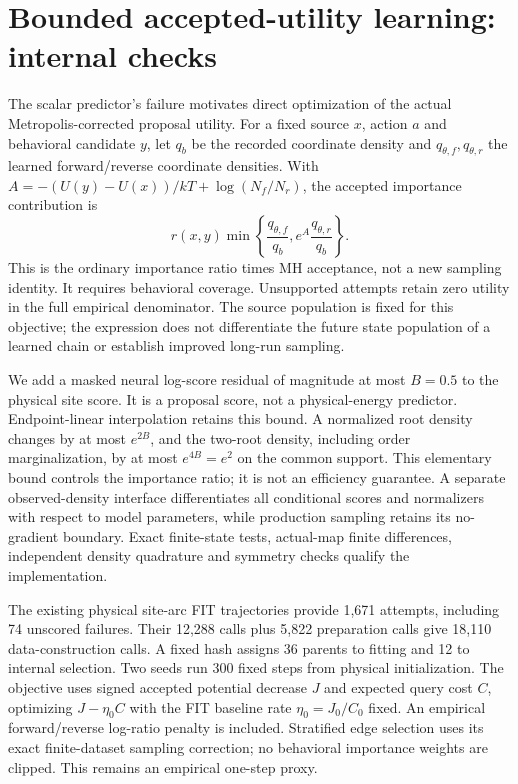\section{Bounded accepted-utility learning: internal checks}
\label{app:accepted-utility}

The scalar predictor's failure motivates direct optimization of the actual
Metropolis-corrected proposal utility. For a fixed source $x$, action $a$ and
behavioral candidate $y$, let $q_b$ be the recorded coordinate density and
$q_{\theta,f},q_{\theta,r}$ the learned forward/reverse coordinate densities.
With $A=-(U(y)-U(x))/kT+\log(N_f/N_r)$, the accepted importance contribution is
\begin{equation}
 r(x,y)\min\!\left\{\frac{q_{\theta,f}}{q_b},
                    e^A\frac{q_{\theta,r}}{q_b}\right\}.
\end{equation}
This is the ordinary importance ratio times MH acceptance, not a new sampling
identity. It requires behavioral coverage. Unsupported attempts retain zero
utility in the full empirical denominator. The source population is fixed for
this objective; the expression does not differentiate the future state
population of a learned chain or establish improved long-run sampling.

We add a masked neural log-score residual of magnitude at most $B=0.5$ to the
physical site score. It is a proposal score, not a physical-energy predictor.
Endpoint-linear interpolation retains this bound. A normalized root density
changes by at most $e^{2B}$, and the two-root density, including order
marginalization, by at most $e^{4B}=e^2$ on the common support. This elementary
bound controls the importance ratio; it is not an efficiency guarantee.
A separate observed-density interface differentiates all conditional scores and
normalizers with respect to model parameters, while production sampling retains
its no-gradient boundary. Exact finite-state tests, actual-map finite differences,
independent density quadrature and symmetry checks qualify the implementation.

The existing physical site-arc FIT trajectories provide 1,671 attempts, including
74 unscored failures. Their 12,288 calls plus 5,822 preparation calls give 18,110
data-construction calls. A fixed hash assigns 36 parents to fitting and 12 to
internal selection. Two seeds run 300 fixed steps from physical initialization.
The objective uses signed accepted potential decrease $J$ and expected query cost
$C$, optimizing $J-\eta_0 C$ with the FIT baseline rate $\eta_0=J_0/C_0$ fixed.
An empirical forward/reverse log-ratio penalty is included. Stratified edge
selection uses its exact finite-dataset sampling correction; no behavioral
importance weights are clipped. This remains an empirical one-step proxy.

